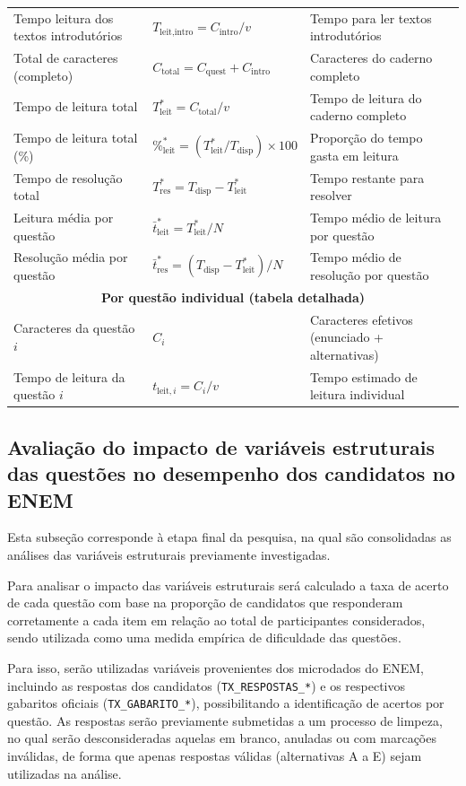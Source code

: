 \documentclass[a4paper,10pt, twocolumn]{article}
\begin{document}
\begin{table}[htb]
\begin{tabular}{lll}
Tempo leitura dos textos introdutórios & $T_{\text{leit,intro}} = C_{\text{intro}} / v$ & Tempo para ler textos introdutórios \\
Total de caracteres (completo) & $C_{\text{total}} = C_{\text{quest}} + C_{\text{intro}}$ & Caracteres do caderno completo \\
Tempo de leitura total & $T_{\text{leit}}^{*} = C_{\text{total}} / v$ & Tempo de leitura do caderno completo \\
Tempo de leitura total (\%) & $\%_{\text{leit}}^{*} = (T_{\text{leit}}^{*} / T_{\text{disp}}) \times 100$ & Proporção do tempo gasta em leitura \\
Tempo de resolução total & $T_{\text{res}}^{*} = T_{\text{disp}} - T_{\text{leit}}^{*}$ & Tempo restante para resolver \\
Leitura média por questão & $\bar{t}_{\text{leit}}^{*} = T_{\text{leit}}^{*} / N$ & Tempo médio de leitura por questão \\
Resolução média por questão & $\bar{t}_{\text{res}}^{*} = (T_{\text{disp}} - T_{\text{leit}}^{*}) / N$ & Tempo médio de resolução por questão \\
\midrule
\multicolumn{3}{c}{\textbf{Por questão individual (tabela detalhada)}} \\
\midrule
Caracteres da questão $i$ & $C_i$ & Caracteres efetivos (enunciado + alternativas) \\
Tempo de leitura da questão $i$ & $t_{\text{leit},i} = C_i / v$ & Tempo estimado de leitura individual \\
\bottomrule 
\end{tabular}
\end{table}

\subsection{Avaliação do impacto de variáveis estruturais das questões no desempenho dos candidatos no ENEM}
\label{sec:avaliacao-impacto-variaveis}
Esta subseção corresponde à etapa final da pesquisa, na qual são consolidadas as análises das variáveis estruturais previamente investigadas.

Para analisar o impacto das variáveis estruturais será calculado a taxa de acerto de cada questão com base na proporção de candidatos que responderam corretamente a cada item em relação ao total de participantes considerados, sendo utilizada como uma medida empírica de dificuldade das questões.

Para isso, serão utilizadas variáveis provenientes dos microdados do ENEM, incluindo as respostas dos candidatos (\texttt{TX\_RESPOSTAS\_*}) e os respectivos gabaritos oficiais (\texttt{TX\_GABARITO\_*}), possibilitando a identificação de acertos por questão. As respostas serão previamente submetidas a um processo de limpeza, no qual serão desconsideradas aquelas em branco, anuladas ou com marcações inválidas, de forma que apenas respostas válidas (alternativas A a E) sejam utilizadas na análise.
\end{document}
